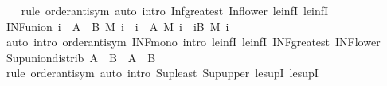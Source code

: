\begin{isabellebody}
%
\isadelimproof
\ \ %
\endisadelimproof
%
\isatagproof
{}\isamarkupfalse%
\ {\isacharparenleft}{\kern0pt}rule\ order{\isachardot}{\kern0pt}antisym{\isacharparenright}{\kern0pt}\ {\isacharparenleft}{\kern0pt}auto\ intro{\isacharcolon}{\kern0pt}\ Inf{\isacharunderscore}{\kern0pt}greatest\ Inf{\isacharunderscore}{\kern0pt}lower\ le{\isacharunderscore}{\kern0pt}infI{}\ le{\isacharunderscore}{\kern0pt}infI{}{\isacharparenright}{\kern0pt}%
\endisatagproof
{\isafoldproof}%
%
\isadelimproof
\isanewline
%
\endisadelimproof
\isanewline
{}\isamarkupfalse%
\ INF{\isacharunderscore}{\kern0pt}union{\isacharcolon}{\kern0pt}\ {\isachardoublequoteopen}{\isacharparenleft}{\kern0pt}{\isasymSqinter}i\ {\isasymin}\ A\ {\isasymunion}\ B{\isachardot}{\kern0pt}\ M\ i{\isacharparenright}{\kern0pt}\ {\isacharequal}{\kern0pt}\ {\isacharparenleft}{\kern0pt}{\isasymSqinter}i\ {\isasymin}\ A{\isachardot}{\kern0pt}\ M\ i{\isacharparenright}{\kern0pt}\ {\isasymsqinter}\ {\isacharparenleft}{\kern0pt}{\isasymSqinter}i{\isasymin}B{\isachardot}{\kern0pt}\ M\ i{\isacharparenright}{\kern0pt}{\isachardoublequoteclose}\isanewline
%
\isadelimproof
\ \ %
\endisadelimproof
%
\isatagproof
{}\isamarkupfalse%
\ {\isacharparenleft}{\kern0pt}auto\ intro{\isacharbang}{\kern0pt}{\isacharcolon}{\kern0pt}\ order{\isachardot}{\kern0pt}antisym\ INF{\isacharunderscore}{\kern0pt}mono\ intro{\isacharcolon}{\kern0pt}\ le{\isacharunderscore}{\kern0pt}infI{}\ le{\isacharunderscore}{\kern0pt}infI{}\ INF{\isacharunderscore}{\kern0pt}greatest\ INF{\isacharunderscore}{\kern0pt}lower{\isacharparenright}{\kern0pt}%
\endisatagproof
{\isafoldproof}%
%
\isadelimproof
\isanewline
%
\endisadelimproof
\isanewline
{}\isamarkupfalse%
\ Sup{\isacharunderscore}{\kern0pt}union{\isacharunderscore}{\kern0pt}distrib{\isacharcolon}{\kern0pt}\ {\isachardoublequoteopen}{\isasymSqunion}{\isacharparenleft}{\kern0pt}A\ {\isasymunion}\ B{\isacharparenright}{\kern0pt}\ {\isacharequal}{\kern0pt}\ {\isasymSqunion}A\ {\isasymsqunion}\ {\isasymSqunion}B{\isachardoublequoteclose}\isanewline
%
\isadelimproof
\ \ %
\endisadelimproof
%
\isatagproof
{}\isamarkupfalse%
\ {\isacharparenleft}{\kern0pt}rule\ order{\isachardot}{\kern0pt}antisym{\isacharparenright}{\kern0pt}\ {\isacharparenleft}{\kern0pt}auto\ intro{\isacharcolon}{\kern0pt}\ Sup{\isacharunderscore}{\kern0pt}least\ Sup{\isacharunderscore}{\kern0pt}upper\ le{\isacharunderscore}{\kern0pt}supI{}\ le{\isacharunderscore}{\kern0pt}supI{}{\isacharparenright}{\kern0pt}%

\end{isabellebody}
